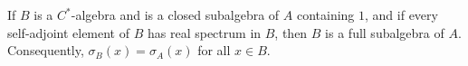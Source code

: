 If $B$ is a $C^*$-algebra and is a closed subalgebra of $A$ containing $1$, and if every self-adjoint element of $B$ has real spectrum in $B$, then $B$ is a full subalgebra of $A$. Consequently, $\sigma_B(x) = \sigma_A(x)$ for all $x \in B$.
